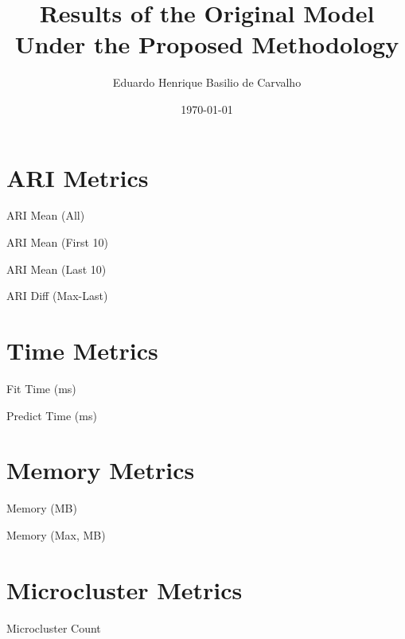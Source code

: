 \documentclass{beamer}
\title{Results of the Original Model Under the Proposed Methodology}
\author{Eduardo Henrique Basilio de Carvalho}
\date{\today}
\begin{document}
\frame{\titlepage}

\section{ARI Metrics}

\begin{frame}[t]{ARI Mean (All)}
	
\end{frame}

\begin{frame}[t]{ARI Mean (First 10)}
	
\end{frame}

\begin{frame}[t]{ARI Mean (Last 10)}
	
\end{frame}

\begin{frame}[t]{ARI Diff (Max-Last)}
	
\end{frame}

\section{Time Metrics}

\begin{frame}[t]{Fit Time (ms)}
	
\end{frame}

\begin{frame}[t]{Predict Time (ms)}
	
\end{frame}

\section{Memory Metrics}

\begin{frame}[t]{Memory (MB)}
	
\end{frame}

\begin{frame}[t]{Memory (Max, MB)}
	
\end{frame}

\section{Microcluster Metrics}

\begin{frame}[t]{Microcluster Count}
	
\end{frame}
\end{document}
